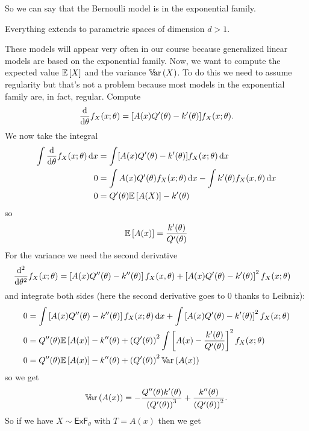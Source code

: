 \documentclass[12pt]{report}
\begin{document}
So we can say that the Bernoulli model is in the exponential family.
\begin{remark}
	Everything extends to parametric spaces of dimension $d>1$.
\end{remark}
These models will appear very often in our course because generalized linear models are based on the exponential family. Now, we want to compute the expected value $\mathbb{E}\left[X\right]$ and the variance $\mathbb{V}\!\mathrm{ar}\,(X)$. To do this we need to assume regularity but that's not a problem because most models in the exponential family are, in fact, regular. Compute
\begin{equation*}
	\frac{\mathop{}\!\mathrm{d}}{\mathop{}\!\mathrm{d}\theta}f_{X}(x;\theta)=[A(x)Q'(\theta)-k'(\theta)]f_{X}(x;\theta).
\end{equation*}
We now take the integral
\begin{align*}
	\int	\frac{\mathop{}\!\mathrm{d}}{\mathop{}\!\mathrm{d}\theta}f_{X}(x;\theta)\mathop{}\!\mathrm{d} x&=\int[A(x)Q'(\theta)-k'(\theta)]f_{X}(x;\theta)\mathop{}\!\mathrm{d} x\\
	0&=\int A(x)Q'(\theta)f_{X}(x;\theta)\mathop{}\!\mathrm{d} x-\int k'(\theta)f_{X}(x,\theta)\mathop{}\!\mathrm{d} x\\
	0&=Q'(\theta)\mathbb{E}\left[A(X)\right]-k'(\theta)
\end{align*} 
so
\begin{equation*}
	\mathbb{E}\left[A(x)\right]=\frac{k'(\theta)}{Q'(\theta)}
\end{equation*}
For the variance we need the second derivative
\begin{align*}
	\frac{\mathop{}\!\mathrm{d}^{2}}{\mathop{}\!\mathrm{d}\theta^{2}}f_{X}(x;\theta)&=\left[A(x)Q''(\theta)-k''(\theta)\right]f_{X}(x,\theta)+\left[A(x)Q'(\theta)-k'(\theta)\right]^{2}f_{X}(x;\theta)
\end{align*}
and integrate both sides (here the second derivative goes to 0 thanks to Leibniz):
\begin{align*}
	0&=\int\left[A(x)Q''(\theta)-k''(\theta)\right]f_{X}(x;\theta)\mathop{}\!\mathrm{d} x+\int\left[A(x)Q'(\theta)-k'(\theta)\right]^{2}f_{X}(x;\theta)\\
	0&=Q''(\theta)\mathbb{E}\left[A(x)\right]-k''(\theta)+\left(Q'(\theta)\right)^{2}\int\left[A(x)-\frac{k'(\theta)}{Q'(\theta)}\right]^{2}f_{X}(x;\theta)\\
	0&=Q''(\theta)\mathbb{E}\left[A(x)\right]-k''(\theta)+\left(Q'(\theta)\right)^{2}\mathbb{V}\!\mathrm{ar}\,(A(x))
\end{align*}
so we get
\begin{equation*}
	\mathbb{V}\!\mathrm{ar}\,(A(x))=-\frac{Q''(\theta)k'(\theta)}{\left(Q'(\theta)\right)^{3}}+\frac{k''(\theta)}{\left(Q'(\theta)\right)^{2}}.
\end{equation*}
So if we have $X\sim \mathsf{ExF}_{\theta}$ with $T=A(x)$ then we get
\end{document}
